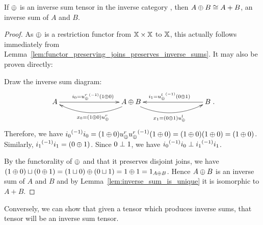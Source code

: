 \begin{lemma}\label{lem:an_inverse_sum_tensor_gives_inverse_sums}
  If $\oplus$ is an inverse sum tensor in the inverse category \X, then $A\oplus B \cong A+B$, an inverse
  sum of $A$ and $B$.
\end{lemma}
\begin{proof}
  As $\oplus$ is a restriction functor from $\mathbb{X}\times\mathbb{X}$ to $\mathbb{X}$, this actually follows immediately
  from Lemma~\ref{lem:functor_preserving_joins_preserves_inverse_sums}. It may also be proven
  directly:

  Draw the inverse sum diagram:
  \[
    \xymatrix @C+60pt{
      A\ar[r]^{i_0=\inv{\upr} (1\+0)}
        & A\+B \ar@/^15pt/[l]^{x_0=(1\+0)\upr} \ar@/_15pt/[r]_{x_1=(0\+1)\upl}
          & B \ar[l]_{i_1=\inv{\upl} (0\+1)}
    }.
  \]
  Therefore, we have ${i_0}^{(-1)}i_0 =
  (1\oplus0)u_{\oplus}^r {u_{\oplus}^r}^{(-1)} (1\oplus0) = (1\oplus0)(1\oplus0) = (1\oplus0)$. Similarly, ${i_1}^{(-1)} i_1 = (0\oplus1)$.
  Since $0\perp 1$, we have ${i_0}^{(-1)}i_0 \perp {i_1}^{(-1)} i_1$.

  By the functorality of $\oplus$ and that it preserves disjoint joins, we have $(1\oplus0) \sqcup (0 \oplus1)
  = (1\sqcup 0 ) \oplus (0\sqcup 1) = 1 \oplus 1 = 1_{A\oplus B}$. Hence $A\oplus B$ is an inverse sum of $A$ and
  $B$ and by Lemma~\ref{lem:inverse_sum_is_unique} it is isomorphic to $A+B$.
\end{proof}

Conversely, we can show that given a tensor which produces inverse sums, that tensor will
be an inverse sum tensor.

